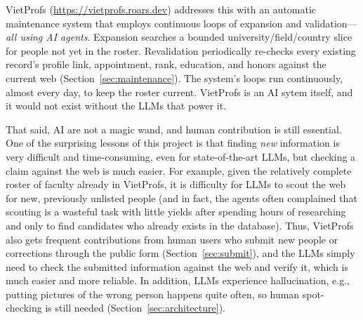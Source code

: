 \documentclass[11pt]{article}
\begin{document}
VietProfs (\url{https://vietprofs.roars.dev}) addresses this with an automatic maintenance system that employs continuous loops of expansion and validation---\emph{all using AI agents}.
Expansion searches a bounded university/field/country slice for people not yet in the roster.
Revalidation periodically re-checks every existing record's profile link, appointment, rank, education, and honors against the current web (Section~\ref{sec:maintenance}).
The system's loops run continuously, almost every day, to keep the roster current.
VietProfs is an AI sytem itself, and it would not exist without the LLMs that power it.


That said, AI are not a magic wand, and human contribution is still essential. One of the surprising lessons of this project is that finding \emph{new} information is very difficult and time-consuming, even for state-of-the-art LLMs, but checking a claim against the web is much easier.
For example, given the relatively complete roster of faculty already in VietProfs, it is difficulty for LLMs to scout the web for new, previously unlisted people (and in fact, the agents often complained that scouting is a wasteful task with little yields after spending hours of researching and only to find candidates who already exists in the database). Thus, VietProfs also gets frequent contributions from human users who submit new people or corrections through the public form (Section~\ref{sec:submit}), and the LLMs simply need to check the submitted information against the web and verify it, which is much easier and more reliable. In addition, LLMs experience hallucination, e.g., putting pictures of the wrong person happens quite often, so human spot-checking is still needed (Section~\ref{sec:architecture}).


\end{document}
